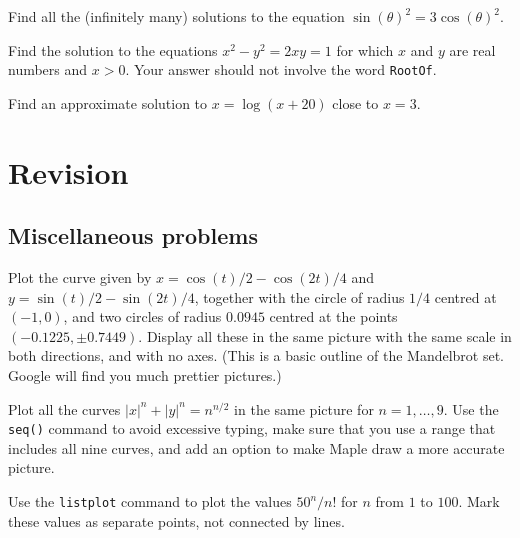 \documentclass[a4paper,10pt]{amsbook}
\begin{document}
\begin{exercise}
 Find all the (infinitely many) solutions to the equation
 $\sin(\theta)^2=3\cos(\theta)^2$. 
\end{exercise}

\begin{exercise}
 Find the solution to the equations $x^2-y^2=2xy=1$ for
 which $x$ and $y$ are real numbers and $x>0$.  Your answer
 should not involve the word \verb~RootOf~. 
\end{exercise}

\begin{exercise}
 Find an approximate solution to $x=\log(x+20)$ close to
 $x=3$.  
\end{exercise}

\chapter{Revision} 

\section{Miscellaneous problems}

\begin{exercise}
 Plot the curve given by $x=\cos(t)/2-\cos(2t)/4$ and
 $y=\sin(t)/2-\sin(2t)/4$, together with the circle of radius $1/4$
 centred at $(-1,0)$, and two circles of radius $0.0945$ centred at
 the points $(-0.1225,\pm 0.7449)$.  Display all these in the same
 picture with the same scale in both directions, and with no axes.
 (This is a basic outline of the Mandelbrot set.  Google will find you
 much prettier pictures.)
\end{exercise}

\begin{exercise}
 Plot all the curves $|x|^n+|y|^n=n^{n/2}$ in the same picture for
 $n=1,\dotsc,9$.  Use the \verb~seq()~ command to avoid excessive
 typing, make sure that you use a range that includes all nine curves,
 and add an option to make Maple draw a more accurate picture.
\end{exercise}

\begin{exercise}
 Use the \verb~listplot~ command to plot the values $50^n/n!$ for $n$
 from $1$ to $100$.  Mark these values as separate points, not
 connected by lines.
\end{exercise}
\end{document}
